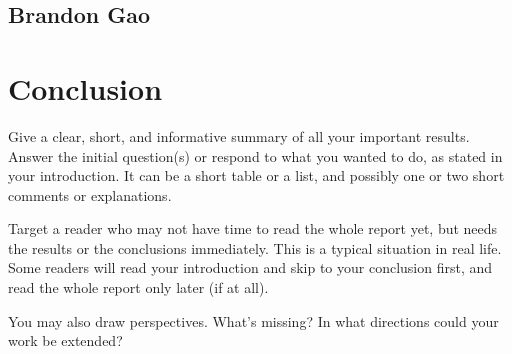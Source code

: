 \documentclass{scrartcl}
\begin{document}
\subsection{Brandon Gao}

\section{Conclusion}

Give a clear, short, and informative summary of all your important results. Answer the initial question(s) or respond to what you wanted to do, as stated in your introduction. It can be a short table or a list, and possibly one or two short comments or explanations. 

Target a reader who may not have time to read the whole report yet, but needs the results or the conclusions immediately. This is a typical situation in real life. Some readers will read your introduction and skip to your conclusion first, and read the whole report only later (if at all).

You may also draw perspectives. What's missing? In what directions could your work be extended?

\newpage
\singlespacing




\end{document}
